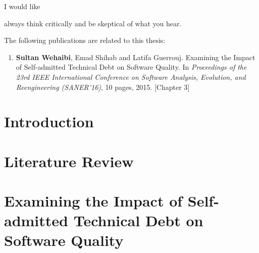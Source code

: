 \documentclass[12pt]{report}
\begin{document}
\begin{acknowledgments}

I would like 

\end{acknowledgments}




\begin{dedication}
	\begin{flushright}
	always think critically and be skeptical of what you hear.\\
	\end{flushright}
\end{dedication}

\begin{publications}

The following publications are related to this thesis:

\begin{enumerate}

\item \textbf{Sultan Wehaibi}, Emad Shihab and Latifa Guerrouj. Examining the Impact of Self-admitted Technical Debt on Software Quality. In \textit{Proceedings of the 23rd IEEE International Conference on Software Analysis, Evolution, and Reengineering (SANER’16)}, 10 pages, 2015. [Chapter 3]


\end{enumerate}

\end{publications}

\chapter{Introduction}
\label{introduction}


\chapter{Literature Review}
\label{literature_review}


\chapter{Examining the Impact of Self-admitted Technical Debt on Software Quality}
\label{chapter3}

\end{document}
